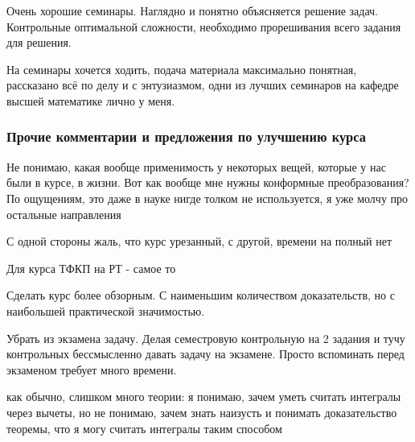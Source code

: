             \begin{commentbox} 
                Очень хорошие семинары. Наглядно и понятно объясняется решение задач. Контрольные оптимальной сложности, необходимо прорешивания всего задания для решения. 
            \end{commentbox} 
        
            \begin{commentbox} 
                На семинары хочется ходить, подача материала максимально понятная, рассказано всё по делу и с энтузиазмом, одни из лучших семинаров на кафедре высшей математике лично у меня. 
            \end{commentbox} 

    
    \subsubsection{Прочие комментарии и предложения по улучшению курса}
        \begin{commentbox}
            Не понимаю, какая вообще применимость у некоторых вещей, которые у нас были в курсе, в жизни. Вот как вообще мне нужны конформные преобразования? По ощущениям, это даже в науке нигде толком не используется, я уже молчу про остальные направления 
        \end{commentbox}

        \begin{commentbox}
            С одной стороны жаль, что курс урезанный, с другой, времени на полный нет
        \end{commentbox}

        \begin{commentbox}
            Для курса ТФКП на РТ - самое то
        \end{commentbox}

        \begin{commentbox}
            Сделать курс более обзорным. С наименьшим количеством доказательств, но с наибольшей практической значимостью.
        \end{commentbox}

        \begin{commentbox}
            Убрать из экзамена задачу. Делая семестровую контрольную на 2 задания и тучу контрольных бессмысленно давать задачу на экзамене. Просто вспоминать перед экзаменом требует много времени.
        \end{commentbox}

        \begin{commentbox}
            как обычно, слишком много теории: я понимаю, зачем уметь считать интегралы через вычеты, но не понимаю, зачем знать наизусть и понимать доказательство теоремы, что я могу считать интегралы таким способом
        \end{commentbox}

